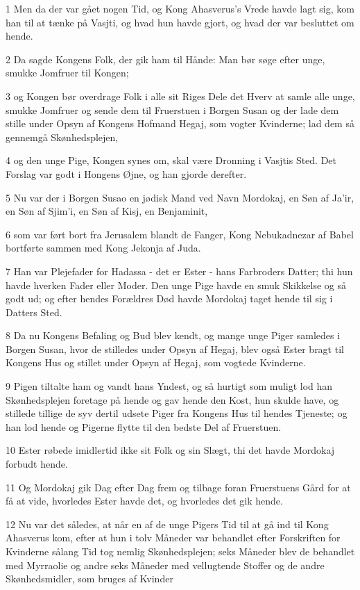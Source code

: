 \par 1 Men da der var gået nogen Tid, og Kong Ahasverus's Vrede havde lagt sig, kom han til at tænke på Vasjti, og hvad hun havde gjort, og hvad der var besluttet om hende.
\par 2 Da sagde Kongens Folk, der gik ham til Hånde: Man bør søge efter unge, smukke Jomfruer til Kongen;
\par 3 og Kongen bør overdrage Folk i alle sit Riges Dele det Hverv at samle alle unge, smukke Jomfruer og sende dem til Fruerstuen i Borgen Susan og der lade dem stille under Opsyn af Kongens Hofmand Hegaj, som vogter Kvinderne; lad dem så gennemgå Skønhedsplejen,
\par 4 og den unge Pige, Kongen synes om, skal være Dronning i Vasjtis Sted. Det Forslag var godt i Hongens Øjne, og han gjorde derefter.
\par 5 Nu var der i Borgen Susao en jødisk Mand ved Navn Mordokaj, en Søn af Ja'ir, en Søn af Sjim'i, en Søn af Kisj, en Benjaminit,
\par 6 som var ført bort fra Jerusalem blandt de Fanger, Kong Nebukadnezar af Babel bortførte sammen med Kong Jekonja af Juda.
\par 7 Han var Plejefader for Hadassa - det er Ester - hans Farbroders Datter; thi hun havde hverken Fader eller Moder. Den unge Pige havde en smuk Skikkelse og så godt ud; og efter hendes Forældres Død havde Mordokaj taget hende til sig i Datters Sted.
\par 8 Da nu Kongens Befaling og Bud blev kendt, og mange unge Piger samledes i Borgen Susan, hvor de stilledes under Opsyn af Hegaj, blev også Ester bragt til Kongens Hus og stillet under Opsyn af Hegaj, som vogtede Kvinderne.
\par 9 Pigen tiltalte ham og vandt hans Yndest, og så hurtigt som muligt lod han Skønhedsplejen foretage på hende og gav hende den Kost, hun skulde have, og stillede tillige de syv dertil udsete Piger fra Kongens Hus til hendes Tjeneste; og han lod hende og Pigerne flytte til den bedste Del af Fruerstuen.
\par 10 Ester røbede imidlertid ikke sit Folk og sin Slægt, thi det havde Mordokaj forbudt hende.
\par 11 Og Mordokaj gik Dag efter Dag frem og tilbage foran Fruerstuens Gård for at få at vide, hvorledes Ester havde det, og hvorledes det gik hende.
\par 12 Nu var det således, at når en af de unge Pigers Tid til at gå ind til Kong Ahasverus kom, efter at hun i tolv Måneder var behandlet efter Forskriften for Kvinderne sålang Tid tog nemlig Skønhedsplejen; seks Måneder blev de behandlet med Myrraolie og andre seks Måneder med vellugtende Stoffer og de andre Skønhedsmidler, som bruges af Kvinder
